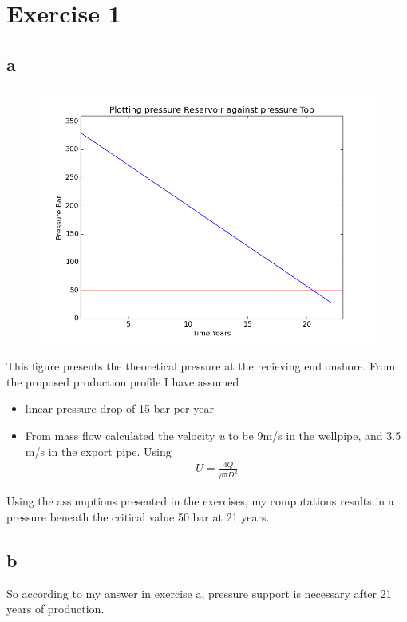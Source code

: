 \documentclass[a4paper,norsk]{article}
\begin{document}
\maketitle

\section*{Exercise 1}
\subsection*{a}
\begin{figure}[h!]  
  \centering
  \includegraphics[scale=0.4]{Pressure.png}
\end{figure}
This figure presents the theoretical pressure at the recieving end onshore. From the proposed production profile I have assumed  
\begin{itemize}
\item linear pressure drop of 15 bar per year
\item From mass flow calculated the velocity \textit{u} to be 9m/s in the wellpipe, and 3.5 m/s in the export pipe. Using
\begin{align}
U = \frac{4Q}{\rho \pi D^2}
\end{align}
\end{itemize}
Using the assumptions presented in the exercises, my computations results in a pressure beneath the critical value 50 bar at 21 years.


\subsection*{b}
So according to my answer in exercise a, pressure support is necessary after 21 years of production.
\end{document}
